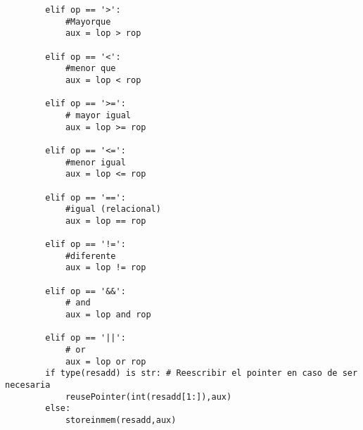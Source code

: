 \documentclass[krantz1,ChapterTOCs, spanish]{krantz}
\begin{document}
\begin{verbatim}
        elif op == '>': 
            #Mayorque
            aux = lop > rop
    
        elif op == '<':
            #menor que
            aux = lop < rop
    
        elif op == '>=': 
            # mayor igual
            aux = lop >= rop
    
        elif op == '<=': 
            #menor igual
            aux = lop <= rop
    
        elif op == '==': 
            #igual (relacional)
            aux = lop == rop
    
        elif op == '!=': 
            #diferente
            aux = lop != rop
    
        elif op == '&&': 
            # and
            aux = lop and rop
    
        elif op == '||': 
            # or
            aux = lop or rop
        if type(resadd) is str: # Reescribir el pointer en caso de ser necesaria
            reusePointer(int(resadd[1:]),aux)
        else:
            storeinmem(resadd,aux)
\end{verbatim}

%
%

\printindex
\end{document}

